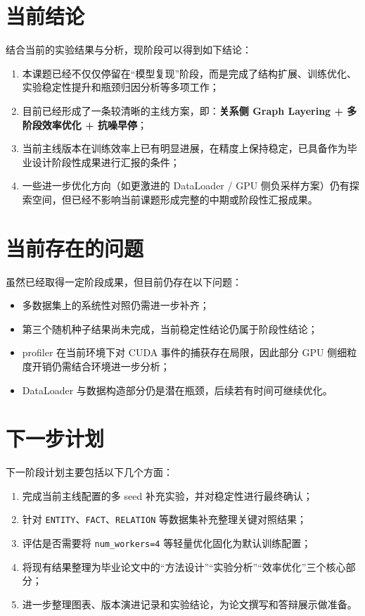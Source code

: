 \documentclass[12pt,a4paper]{ctexart}
\begin{document}
\section{当前结论}
结合当前的实验结果与分析，现阶段可以得到如下结论：
\begin{enumerate}
  \item 本课题已经不仅仅停留在“模型复现”阶段，而是完成了结构扩展、训练优化、实验稳定性提升和瓶颈归因分析等多项工作；
  \item 目前已经形成了一条较清晰的主线方案，即：\textbf{关系侧 Graph Layering + 多阶段效率优化 + 抗噪早停}；
  \item 当前主线版本在训练效率上已有明显进展，在精度上保持稳定，已具备作为毕业设计阶段性成果进行汇报的条件；
  \item 一些进一步优化方向（如更激进的 DataLoader / GPU 侧负采样方案）仍有探索空间，但已经不影响当前课题形成完整的中期或阶段性汇报成果。
\end{enumerate}

\section{当前存在的问题}
虽然已经取得一定阶段成果，但目前仍存在以下问题：
\begin{itemize}
  \item 多数据集上的系统性对照仍需进一步补齐；
  \item 第三个随机种子结果尚未完成，当前稳定性结论仍属于阶段性结论；
  \item profiler 在当前环境下对 CUDA 事件的捕获存在局限，因此部分 GPU 侧细粒度开销仍需结合环境进一步分析；
  \item DataLoader 与数据构造部分仍是潜在瓶颈，后续若有时间可继续优化。
\end{itemize}

\section{下一步计划}
下一阶段计划主要包括以下几个方面：
\begin{enumerate}
  \item 完成当前主线配置的多 seed 补充实验，并对稳定性进行最终确认；
  \item 针对 \texttt{ENTITY}、\texttt{FACT}、\texttt{RELATION} 等数据集补充整理关键对照结果；
  \item 评估是否需要将 \texttt{num\_workers=4} 等轻量优化固化为默认训练配置；
  \item 将现有结果整理为毕业论文中的“方法设计”“实验分析”“效率优化”三个核心部分；
  \item 进一步整理图表、版本演进记录和实验结论，为论文撰写和答辩展示做准备。
\end{enumerate}
\end{document}
